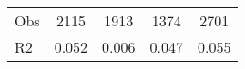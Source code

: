 \begin{tabular}{l*{4}{c}}
\hline                                                                                                                                                                                                                                            
 Obs                   &               2115               &       1913                       &       1374                &              2701                                               \\ 
 R2                    &                      0.052              &              0.006                      &              0.047               &                     0.055                                              \\ 
\hline \end{tabular}                                                                                                                                                                                                              